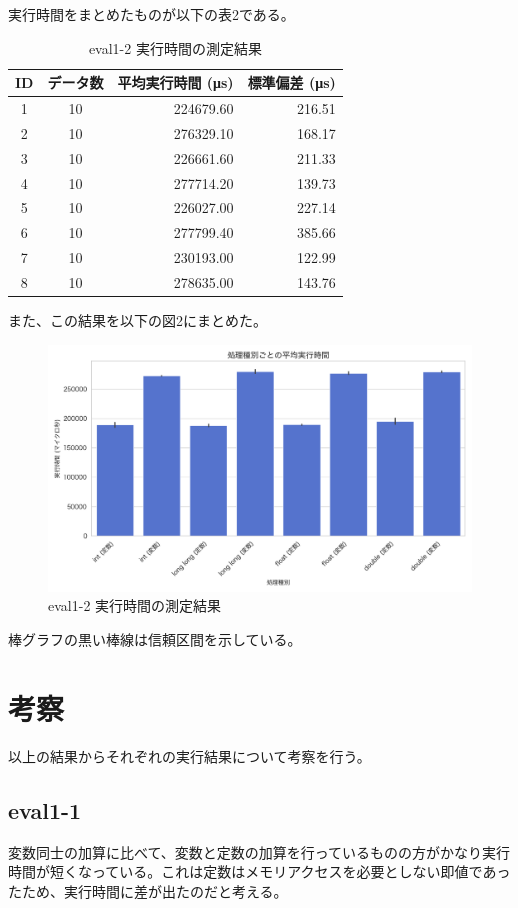 \documentclass [11pt,a4paper,dvipdfmx]{ujarticle}
\begin{document}
実行時間をまとめたものが以下の表2である。
\begin{table}[htbp]
  \centering
  \caption{eval1-2 実行時間の測定結果}
  \label{tab:eval1-2-results-final}
  \begin{tabular}{ccrr}
    \toprule
    ID & データ数 & 平均実行時間 (μs) & 標準偏差 (μs) \\
    \midrule
    1 & 10 & 224679.60 & 216.51 \\
    2 & 10 & 276329.10 & 168.17 \\
    3 & 10 & 226661.60 & 211.33 \\
    4 & 10 & 277714.20 & 139.73 \\
    5 & 10 & 226027.00 & 227.14 \\
    6 & 10 & 277799.40 & 385.66 \\
    7 & 10 & 230193.00 & 122.99 \\
    8 & 10 & 278635.00 & 143.76 \\
    \bottomrule
  \end{tabular}
\end{table}

また、この結果を以下の図2にまとめた。
\begin{figure}[htbp]
  \centering
  \includegraphics[width=0.8\linewidth]{result1-2.png}
  \caption{eval1-2 実行時間の測定結果}
\end{figure}

棒グラフの黒い棒線は信頼区間を示している。
\clearpage
\section{考察}
以上の結果からそれぞれの実行結果について考察を行う。
\subsection{eval1-1}
変数同士の加算に比べて、変数と定数の加算を行っているものの方がかなり実行時間が短くなっている。これは定数はメモリアクセスを必要としない即値であったため、実行時間に差が出たのだと考える。
\end{document}
